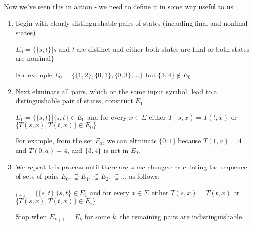 Now we've seen this in action - we need to define it in some way useful to us:

\begin{enumerate}
    \item Begin with clearly distinguishable pairs of states (including final and nonfinal states)
    \begin{center}
        $E_0 = \{\{s,t\} | s$ and $t$ are distinct and either both states are final or both states are nonfinal$\}$
    \end{center}
    For example $E_0 = \{\{1,2\}, \{0,1\}, \{0,3\}, \ldots\}$ but $\{3,4\} \notin E_0$

    \item Next eliminate all pairs, which on the same input symbol, lead to a distinguishable pair of states, construct $E_1$
    \begin{center}
        $E_1 = \{\{s,t\} | \{s, t\} \in E_0$ and for every $x \in \Sigma$ either $T(s,x) = T(t,x)$ or $\{T(s,x), T(t,x)\} \in E_0 \}$
    \end{center}
    For example, from the set $E_0$, we can eliminate $\{0,1\}$ because $T(1,a) = 4$ and $T(0,a) = 4$, and $\{3,4\}$ is not in $E_0$.

    \item We repeat this process until there are some changes: calculating the sequence of sets of pairs $E_0, \supseteq E_1, \subseteq E_2, \subseteq \ldots$ as follows:
    \begin{center}
        $_{i+1} = \{\{s,t\} | \{s,t\} \in E_1$ and for every $x \in \Sigma$ either $T(s,x) = T(t,x)$ or $\{T(s,x), T(t,x)\} \in E_i \}$
    \end{center}
    Stop when $E_{k+1} = E_k$ for some $k$, the remaining pairs are indistinguishable.
\end{enumerate}

